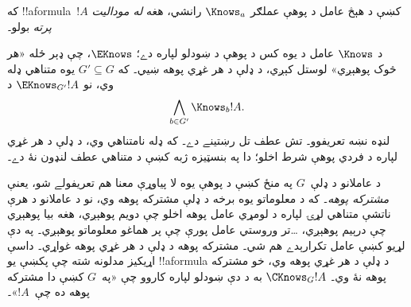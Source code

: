 \documentclass[../../../include/open-logic-section]{subfiles}
\begin{document}
که !!a{formula}~$!A$ کښې د هېڅ عامل د پوهې عملګر $\Knows_a$ رانشي،
هغه \emph{له موداليت پرته} بولو۔

\begin{defn}
  د $\Knows$ عامل د يوه کس د پوهې د ښودلو لپاره دے؛ $\EKnows$،
  چې ډېر ځله «هر څوک پوهېږي» لوستل کېږي، د ډلې د هر غړي پوهه ښيي۔
  که $G' \subseteq G$ يوه متناهي ډله وي، نو $\EKnows_{G'} !A$ د
  \[\bigwedge_{b \in G'} \Knows_b !A.\] لنډه نښه تعريفوو۔
  تش عطف تل رښتينے دے۔ که ډله نامتناهي وي، د ډلې د هر غړي لپاره
  د فردي پوهې شرط اخلو؛ دا په بنسټيزه ژبه کښې د متناهي عطف لنډون
  نۀ دے۔
\end{defn}

د عاملانو د ډلې~$G$ په منځ کښې د پوهې يوه لا پياوړې معنا هم
تعريفولے شو، يعنې \emph{مشترکه پوهه}۔ که د معلوماتو يوه برخه د
ډلې مشترکه پوهه وي، نو د عاملانو د هرې ناتشې متناهي لړۍ لپاره
د لومړي عامل پوهه اخلو چې دويم پوهېږي، هغه بيا پوهېږي چې درېيم
پوهېږي، \dots تر وروستي عامل پورې چې پر هماغو معلوماتو پوهېږي۔
په دې لړيو کښې عامل تکرارېدے هم شي۔ مشترکه پوهه د ډلې د هر غړي
پوهه غواړي۔ داسې اړيکيز مدلونه شته چې پکښې يو !!a{formula} د ډلې
د هر غړي پوهه وي، خو مشترکه پوهه نۀ وي۔ $\CKnows_G !A$ به د دې
ښودلو لپاره کاروو چې «په~$G$ کښې دا مشترکه پوهه ده چې~$!A$»۔
\end{document}
